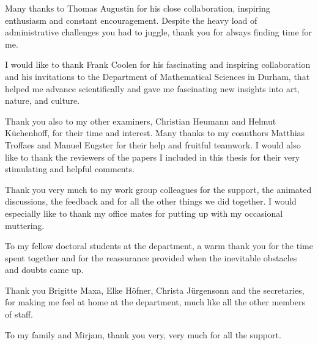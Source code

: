 Many thanks to Thomas Augustin for his close collaboration, inspiring enthusiasm and constant encouragement.
Despite the heavy load of administrative challenges you had to juggle, thank you for always finding time for me. 

I would like to thank Frank Coolen for his fascinating and inspiring collaboration and his invitations
to the Department of Mathematical Sciences in Durham,
that helped me advance scientifically and gave me fascinating new insights into art, nature, and culture.

Thank you also to my other examiners, Christian Heumann and Helmut Küchenhoff, for their time and interest.
Many thanks to my coauthors Matthias Troffaes and Manuel Eugster for their help and fruitful teamwork.
I would also like to thank the reviewers of the papers I included in this thesis for their very stimulating and helpful comments.

Thank you very much to my work group colleagues for the support, the animated discussions,
the feedback and for all the other things we did together.
I would especially like to thank my office mates for putting up with my occasional muttering.

To my fellow doctoral students at the department,
a warm thank you for the time spent together and for the reassurance provided when the inevitable obstacles and doubts came up.

Thank you Brigitte Maxa, Elke Höfner, Christa Jürgensonn and the secretaries,
for making me feel at home at the department, much like all the other members of staff.

To my family and Mirjam, thank you very, very much for all the support.   


